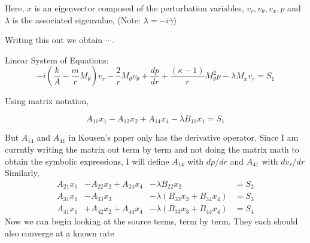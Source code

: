 Here, $x$ is an eigenvector composed of the perturbation variables, $v_r,v_{\theta},v_x,p$ and $\lambda$ is the associated eigenvalue, (Note: $\lambda = -i \bar{\gamma}$)

Writing this out we obtain $\cdots$.

Linear System of Equations:
\begin{equation}
    -
    i \left(
        \frac{k}{A} - \frac{m}{r} M_{\theta}
    \right)
    v_r 
    -
    \frac{2}{r} M_{\theta} v_{\theta} 
    +
    \frac{dp}{dr} 
    +
    \frac{(\kappa - 1)}{r} M_{\theta}^2 p
    -
    \lambda M_x v_r =S_1
\end{equation}

Using matrix notation,

\begin{equation}
    A_{11}
    x_1 
    -
    A_{12} x_2 
    +
    A_{14} x_4
    -
    \lambda B_{11} x_1 = S_1
\end{equation}


But $A_{14}$ and $A_{41}$ in Kousen's paper only has the derivative operator.
Since I am currntly writing the matrix out term by term and not doing the matrix 
math to obtain the symbolic expressions, I will define $A_{14}$ with $dp/dr$ 
and $A_{41}$ with $dv_r/dr$
Similarly,
\begin{align}
    A_{21} x_1 &-
    A_{22} x_2 +
    A_{24} x_4 &-
    \lambda B_{22} x_2 &= S_2 \\
    A_{31} x_1 &-
    A_{33} x_3 &-
    \lambda (B_{33} x_3 + B_{34} x_4) &= S_3\\
    A_{41} x_1 &+
    A_{42} x_2 +
    A_{44} x_4 &- 
    \lambda (B_{33} x_3 + B_{44} x_4) &= S_4
\end{align}
Now we can begin looking at the source terms, term by term. They each should also
converge at a known rate





